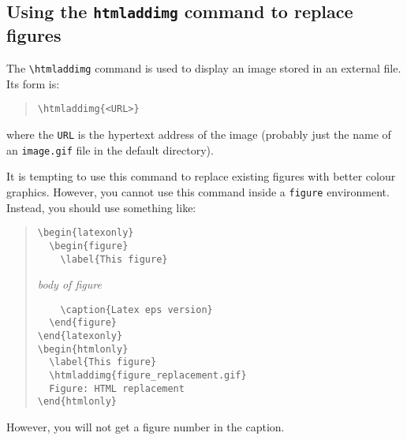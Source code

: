 \documentclass[twoside,11pt]{article}
\newcommand{\htmladdimg}[1]{}
\newenvironment{latexonly}{}{}
\newcommand{\xlabel}[1]{}
\renewcommand{\_}{\texttt{\symbol{95}}}
\begin{document}
\subsection{\xlabel{using_the_htmladdimg_command_to_replace_figures}Using the {\texttt{htmladdimg}} command to replace figures}

The \verb+\htmladdimg+ command is used to display an image stored in an
external file.
Its form is:
\begin{quote}
\begin{verbatim}
\htmladdimg{<URL>}
\end{verbatim}
\end{quote}
where the \texttt{URL} is the hypertext address of the image (probably just
the name of an \texttt{image.gif} file in the default directory).

It is tempting to use this command to replace existing figures with better
colour graphics.
However, you cannot use this command inside a \texttt{figure} environment.
Instead, you should use something like:
\begin{quote}
\begin{verbatim}
\begin{latexonly}
  \begin{figure}
    \label{This figure}
\end{verbatim}
\hspace{3cm}\textit{body of figure}
\begin{verbatim}
    \caption{Latex eps version}
  \end{figure}
\end{latexonly}
\begin{htmlonly}
  \label{This figure}
  \htmladdimg{figure_replacement.gif}
  Figure: HTML replacement
\end{htmlonly}
\end{verbatim}
\end{quote}
However, you will not get a figure number in the caption.
\end{document}
